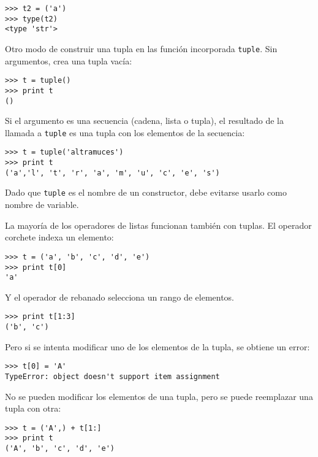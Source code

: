 \beforeverb
\begin{verbatim}
>>> t2 = ('a')
>>> type(t2)
<type 'str'>
\end{verbatim}
\afterverb
%
Otro modo de construir una tupla en las función incorporada {\tt tuple}.
Sin argumentos, crea una tupla vacía:


\beforeverb
\begin{verbatim}
>>> t = tuple()
>>> print t
()
\end{verbatim}
\afterverb
%
Si el argumento es una secuencia (cadena, lista o tupla), el resultado
de la llamada a {\tt tuple} es una tupla con los elementos de la secuencia:

\beforeverb
\begin{verbatim}
>>> t = tuple('altramuces')
>>> print t
('a','l', 't', 'r', 'a', 'm', 'u', 'c', 'e', 's')
\end{verbatim}
\afterverb
%
Dado que {\tt tuple} es el nombre de un constructor, debe evitarse
usarlo como nombre de variable.

La mayoría de los operadores de listas funcionan también con tuplas. El operador corchete
indexa un elemento:


\beforeverb
\begin{verbatim}
>>> t = ('a', 'b', 'c', 'd', 'e')
>>> print t[0]
'a'
\end{verbatim}
\afterverb
%
Y el operador de rebanado selecciona un rango de elementos.


\beforeverb
\begin{verbatim}
>>> print t[1:3]
('b', 'c')
\end{verbatim}
\afterverb
%
Pero si se intenta modificar uno de los elementos de la tupla, se
obtiene un error:


\beforeverb
\begin{verbatim}
>>> t[0] = 'A'
TypeError: object doesn't support item assignment
\end{verbatim}
\afterverb
%
No se pueden modificar los elementos de una tupla, pero se puede
reemplazar una tupla con otra:

\beforeverb
\begin{verbatim}
>>> t = ('A',) + t[1:]
>>> print t
('A', 'b', 'c', 'd', 'e')
\end{verbatim}
\afterverb
%

